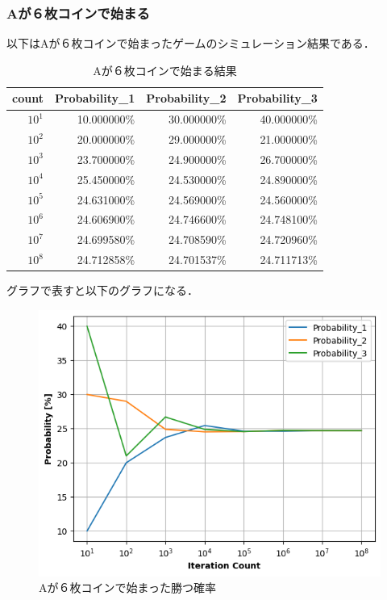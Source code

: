 \documentclass[a4j, titlepage]{jarticle}
\begin{document}
      \subsubsection{Aが６枚コインで始まる}
        以下はAが６枚コインで始まったゲームのシミュレーション結果である．

        \begin{longtable}[c]{|r|r|r|r|}
          \caption{Aが６枚コインで始まる結果}
          \label{tab:coin6}\\
          \hline
          \rowcolor[HTML]{C0C0C0} 
          count    & Probability\_1 & Probability\_2 & Probability\_3 \\ \hline
          \endfirsthead
          \endhead
          $10^1$   & 10.000000\%      & 30.000000\%      & 40.000000\%      \\ \hline
          $10^2$   & 20.000000\%      & 29.000000\%      & 21.000000\%      \\ \hline
          $10^3$   & 23.700000\%      & 24.900000\%      & 26.700000\%      \\ \hline
          $10^4$   & 25.450000\%      & 24.530000\%      & 24.890000\%      \\ \hline
          $10^5$   & 24.631000\%      & 24.569000\%      & 24.560000\%      \\ \hline
          $10^6$   & 24.606900\%      & 24.746600\%      & 24.748100\%      \\ \hline
          $10^7$   & 24.699580\%      & 24.708590\%      & 24.720960\%      \\ \hline
          $10^8$   & 24.712858\%      & 24.701537\%      & 24.711713\%      \\ \hline
        \end{longtable}

        グラフで表すと以下のグラフになる．
        \begin{figure}[htb]
          \begin{center}
            \includegraphics[scale=0.55]{../Dir_Coin/img_coin6.png}
            \caption{Aが６枚コインで始まった勝つ確率}
            \label{img:coin6}
          \end{center}
        \end{figure}
      
\end{document}
